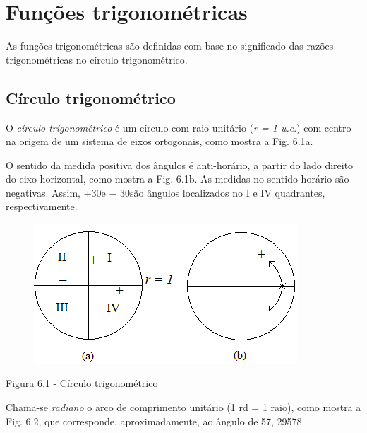 \section{Funções trigonométricas }

As funções trigonométricas são definidas com base no significado das razões trigonométricas no círculo trigonométrico.

\subsection{Círculo trigonométrico}

O \textit{círculo trigonométrico} é um círculo com raio unitário (\textit{r = 1 u.c}.) com centro na origem de um sistema de eixos ortogonais, como mostra a Fig. 6.1a.

O sentido da medida positiva dos ângulos é anti-horário, a partir do lado direito do eixo horizontal, como mostra a Fig. 6.1b. As medidas no sentido horário são negativas. Assim, +30\degree e $-$ 30\degree  são ângulos localizados no I e IV quadrantes, respectivamente.

\begin{figure}[H]
    \begin{Center}
        \includegraphics[width=3.89in,height=2.06in]{capitulos/trigonometria_e_funcoes_trigonometricas/media/image27.png}
    \end{Center}
\end{figure}

\begin{Center}
Figura 6.1 - Círculo trigonométrico
\end{Center}

Chama-se \textit{radiano} o arco de comprimento unitário (1 rd = 1 raio), como mostra a Fig. 6.2, que corresponde, aproximadamente, ao ângulo de 57, 29578\degree .

